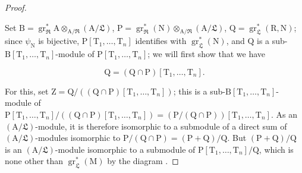 \begin{proof}
\begin{env}[19.7.1.2]
\label{IV.19.7.1.2}
Set $\mathrm{B}=\operatorname{gr}_\mathfrak{R}^*\mathrm{A}\otimes_{\mathrm{A}/\mathfrak{R}}(\mathrm{A}/\mathfrak{L})$, $\mathrm{P}=\operatorname{gr}_\mathfrak{R}^*(\mathrm{N})\otimes_{\mathrm{A}/\mathfrak{R}}(\mathrm{A}/\mathfrak{L})$, $\mathrm{Q}=\operatorname{gr}_\mathfrak{L}^*(\mathrm{R},\mathrm{N})$; since $\psi_\mathrm{N}$ is bijective, $\mathrm{P}[\mathrm{T}_1,\ldots,\mathrm{T}_n]$ identifies with $\operatorname{gr}_\mathfrak{L}^*(\mathrm{N})$, and $\mathrm{Q}$ is a sub-$\mathrm{B}[\mathrm{T}_1,\ldots,\mathrm{T}_n]$-module of $\mathrm{P}[\mathrm{T}_1,\ldots,\mathrm{T}_n]$; we will first show that we have
\end{env}
\begin{env}[19.7.1.3]
\label{IV.19.7.1.3}
\[
  \mathrm{Q}=(\mathrm{Q}\cap\mathrm{P})[\mathrm{T}_1,\ldots,\mathrm{T}_n].
\]
\end{env}

For this, set $\mathrm{Z}=\mathrm{Q}/((\mathrm{Q}\cap\mathrm{P})[\mathrm{T}_1,\ldots,\mathrm{T}_n])$; this is a sub-$\mathrm{B}[\mathrm{T}_1,\ldots,\mathrm{T}_n]$-module of $\mathrm{P}[\mathrm{T}_1,\ldots,\mathrm{T}_n]/((\mathrm{Q}\cap\mathrm{P})[\mathrm{T}_1,\ldots,\mathrm{T}_n])=(\mathrm{P}/(\mathrm{Q}\cap\mathrm{P}))[\mathrm{T}_1,\ldots,\mathrm{T}_n]$. As an $(\mathrm{A}/\mathfrak{L})$-module, it is therefore isomorphic to a submodule of a direct sum of $(\mathrm{A}/\mathfrak{L})$-modules isomorphic to $\mathrm{P}/(\mathrm{Q}\cap\mathrm{P})=(\mathrm{P}+\mathrm{Q})/\mathrm{Q}$. But $(\mathrm{P}+\mathrm{Q})/\mathrm{Q}$ is an $(\mathrm{A}/\mathfrak{L})$-module isomorphic to a submodule of $\mathrm{P}[\mathrm{T}_1,\ldots,\mathrm{T}_n]/\mathrm{Q}$, which is none other than $\operatorname{gr}_\mathfrak{L}^*(\mathrm{M})$ by the diagram .


\end{proof}

